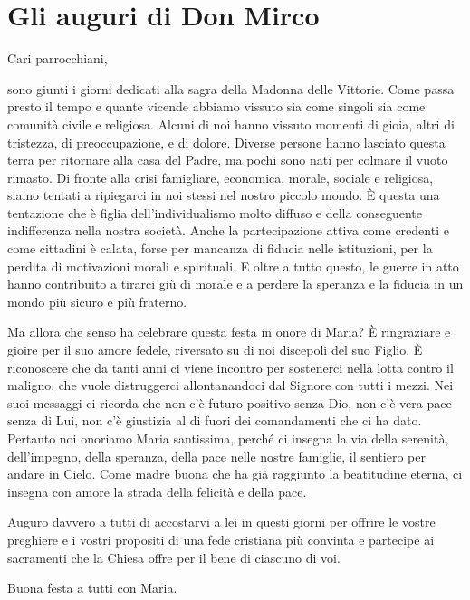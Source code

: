 \section{Gli auguri di Don Mirco}
Cari parrocchiani,

sono giunti i giorni dedicati alla sagra della Madonna delle Vittorie. Come passa presto il tempo e quante vicende abbiamo vissuto sia come singoli sia come comunità civile e religiosa. Alcuni di noi hanno vissuto momenti di gioia, altri di tristezza, di preoccupazione, e di dolore. Diverse persone hanno lasciato questa terra per ritornare alla casa del Padre, ma pochi sono nati per colmare il vuoto rimasto. Di fronte alla crisi famigliare, economica, morale, sociale e religiosa, siamo tentati a ripiegarci in noi stessi nel nostro piccolo mondo. È questa una tentazione che è figlia dell’individualismo molto diffuso e della conseguente indifferenza nella nostra società. Anche la partecipazione attiva come credenti e come cittadini è calata, forse per mancanza di fiducia nelle istituzioni, per la perdita di motivazioni morali e spirituali. E oltre a tutto questo, le guerre in atto hanno contribuito a tirarci giù di morale   e a perdere la speranza e la fiducia in un mondo più sicuro e più fraterno.

Ma allora che senso ha celebrare questa festa in onore di Maria?  È ringraziare e gioire per  il suo amore fedele, riversato su di noi  discepoli del suo Figlio. È riconoscere  che da tanti anni ci viene incontro per sostenerci nella lotta contro il maligno, che vuole distruggerci allontanandoci dal Signore con tutti i mezzi. Nei suoi messaggi ci ricorda che non c’è futuro positivo senza Dio, non c’è vera pace senza di Lui, non c’è giustizia  al di fuori dei comandamenti che ci ha dato. Pertanto noi onoriamo  Maria santissima, perché ci insegna la via della serenità, dell’impegno, della speranza, della pace nelle nostre famiglie, il sentiero per andare in Cielo.  Come madre buona che ha già raggiunto la beatitudine eterna, ci insegna con amore la strada della felicità e della pace.

Auguro davvero a  tutti di accostarvi a lei in questi giorni per offrire le vostre preghiere e i vostri propositi di una fede cristiana più convinta e partecipe ai sacramenti che la Chiesa offre per il bene di ciascuno di voi.

Buona festa a tutti con Maria.

